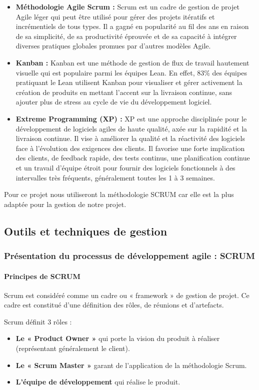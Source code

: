 \begin{itemize}
    \item \textbf{Méthodologie Agile Scrum : } Scrum  est un cadre de gestion de projet Agile léger qui peut être utilisé pour gérer des projets itératifs et incrémentiels de tous types. Il a gagné en popularité au fil des ans en raison de sa simplicité, de sa productivité éprouvée et de sa capacité à intégrer diverses pratiques globales promues par d'autres modèles Agile.
    \item \textbf{Kanban : } Kanban  est une méthode de gestion de flux de travail hautement visuelle qui est populaire parmi les équipes Lean. En effet, 83\% des équipes pratiquant le Lean utilisent Kanban pour visualiser et gérer activement la création de produits en mettant l'accent sur la livraison continue, sans ajouter plus de stress au cycle de vie du développement logiciel.
    \item \textbf{Extreme Programming (XP) : } XP est une approche disciplinée pour le développement de logiciels agiles de haute qualité, axée sur la rapidité et la livraison continue. Il vise à améliorer la qualité et la réactivité des logiciels face à l'évolution des exigences des clients. Il favorise une forte implication des clients, de feedback rapide, des tests continus, une planification continue et un travail d'équipe étroit pour fournir des logiciels fonctionnels à des intervalles très fréquents, généralement toutes les 1 à 3 semaines.
\end{itemize}

Pour ce projet nous utiliseront la méthodologie SCRUM car elle est la plus adaptée pour la gestion de notre projet.

\subsection{Outils et techniques de gestion}
\subsubsection{Présentation du processus de développement agile : SCRUM}
\paragraph{Principes de SCRUM}
Scrum est considéré comme un cadre ou « framework » de gestion de projet. Ce cadre est constitué d'une définition des rôles, de réunions et d'artefacts.

Scrum définit 3 rôles :​
\begin{itemize}
    \item \textbf{Le « Product Owner »} qui porte la vision du produit à réaliser (représentant généralement le client).
    \item \textbf{Le « Scrum Master »} garant de l'application de la méthodologie Scrum.
    \item \textbf{L'équipe de développement} qui réalise le produit.
\end{itemize}

